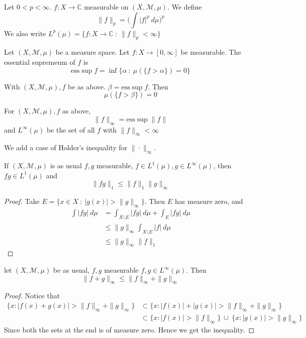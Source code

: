 \begin{definition}
  Let $0< p< \infty$. $ f: X \to \mathbb{C}$ measurable on $(X,
  \mathcal{M}, \mu)$. We define \[
    \|f\|_p = \Big( \int |f|^p \ d \mu\Big)^p
  \]
  We also write $L^p(\mu) = \{ f : X \to \mathbb{C}  \ : \  \|f\|_p <
  \infty  \}$
\end{definition}

\begin{definition}
  Let $(X, \mathcal{M}, \mu)$ be a measure space. Let $f: X \to [0,
  \infty]$ be measurable. The essential supremeum of $f$ is \[
    \textrm{ess}\sup f = \inf \{ \alpha  \ : \  \mu(\{ f> \alpha \}) = 0  \}
  \]
\end{definition}

\begin{proposition}
  With $(X, \mathcal{M}, \mu), f$ be as above. $  \beta =
  \textrm{ess}\sup f$. Then \[
    \mu(\{ f > \beta \}) = 0
  \]
\end{proposition}

\begin{definition}
  For $(X, \mathcal{M}, \mu ), f$ as above,  \[
    \|f\|_\infty = \textrm{ess}\sup \|f\|
  \]
  and $L^\infty(\mu)$ be the set of all $f$ with $\|f\|_\infty < \infty$
\end{definition}

We add a case of Holder's inequality for $\|\cdot\|_\infty$.

\begin{theorem}
  If $(X, \mathcal{M}, \mu)$ is as usual $f, g$ measurable, $ f \in
  L^1(\mu), g \in L^\infty(\mu)$, then $ fg \in L^1(\mu)$ and \[
    \|fg\|_1 \le \|f\|_1 \|g\|_\infty
  \]
\end{theorem}
\begin{proof}
  Take $E = \{ x \in X  \ : \  |g(x)|> \|g\|_\infty \}$. Then $E$ has
  measure zero, and
  \begin{align*}
    \int |fg| \ d \mu &= \int_{X\setminus E}  |fg| \ d \mu + \int_E
    |fg| \ d \mu \\
    & \le \|g\|_\infty \int_{X\setminus E}  |f| \ d \mu \\
    & \le \|g\|_\infty \|f\|_1
  \end{align*}
\end{proof}

\begin{theorem}
  let $(X, \mathcal{M}, \mu)$ be as usual, $f, g$ measurable $ f, g
  \in L^\infty(\mu)$. Then \[
    \|f+g\|_\infty \le \|f\|_\infty + \|g\|_\infty
  \]
\end{theorem}
\begin{proof}
  Notice that
  \begin{align*}
    \{ x  :  |f(x) + g(x)| > \| f\|_\infty + \|g\|_\infty \} & \subset
    \{ x  :  |f(x)| + |g(x)| > \| f\|_\infty + \|g\|_\infty \} \\
    & \subset \{ x :  |f(x)| > \|f\|_\infty \} \ \cup \ \{ x
    : |g(x)|> \|g\|_\infty \}
  \end{align*}
  Since both the sets at the end is of measure zero. Hence we get the
  inequality.
\end{proof}

